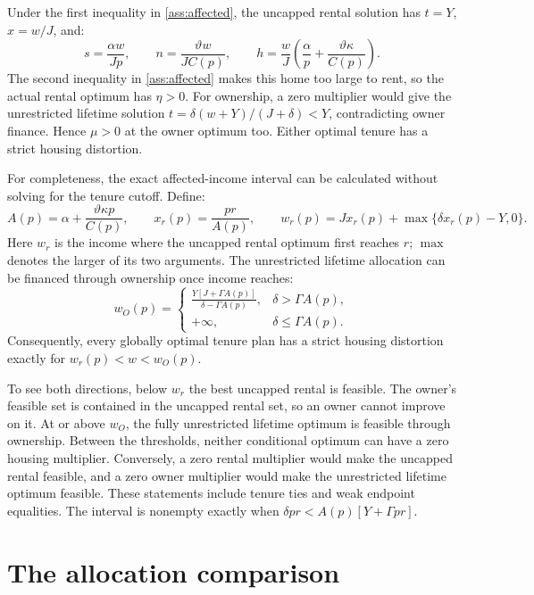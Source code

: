 \documentclass[11pt]{article}
\begin{document}
Under the first inequality in \eqref{ass:affected}, the uncapped rental
solution has $t=Y$, $x=w/J$, and:
\begin{equation}
s=\frac{\alpha w}{Jp},\qquad
n=\frac{\vartheta w}{JC(p)},\qquad
h=\frac{w}{J}\left(\frac{\alpha}{p}
                    +\frac{\vartheta\kappa}{C(p)}\right).
\end{equation}
The second inequality in \eqref{ass:affected} makes this home too large to
rent, so the actual rental optimum has $\eta>0$. For ownership, a zero
multiplier would give the unrestricted lifetime solution
$t=\delta(w+Y)/(J+\delta)<Y$, contradicting owner finance. Hence
$\mu>0$ at the owner optimum too. Either optimal tenure has a strict
housing distortion.

For completeness, the exact affected-income interval can be calculated
without solving for the tenure cutoff. Define:
\begin{equation}
A(p)=\alpha+\frac{\vartheta\kappa p}{C(p)},\qquad
x_r(p)=\frac{pr}{A(p)},\qquad
w_r(p)=Jx_r(p)+\max\{\delta x_r(p)-Y,0\}.
\end{equation}
Here $w_r$ is the income where the uncapped rental optimum first reaches
$r$; $\max$ denotes the larger of its two arguments. The unrestricted
lifetime allocation can be financed through ownership once income reaches:
\begin{equation}
w_O(p)=\begin{cases}
\displaystyle\frac{Y[J+\Gamma A(p)]}{\delta-\Gamma A(p)},
 &\delta>\Gamma A(p),\\[5pt]
+\infty,&\delta\le\Gamma A(p).
\end{cases}
\end{equation}
Consequently, every globally optimal tenure plan has a strict housing
distortion exactly for $w_r(p)<w<w_O(p)$.

To see both directions, below $w_r$ the best uncapped rental is feasible.
The owner's feasible set is contained in the uncapped rental set, so an
owner cannot improve on it. At or above $w_O$, the fully unrestricted
lifetime optimum is feasible through ownership. Between the thresholds,
neither conditional optimum can have a zero housing multiplier. Conversely,
a zero rental multiplier would make the uncapped rental feasible, and a
zero owner multiplier would make the unrestricted lifetime optimum feasible.
These statements include tenure ties and weak endpoint equalities. The
interval is nonempty exactly when $\delta pr<A(p)[Y+\Gamma pr]$.

\section{The allocation comparison}\label{app:allocation}
\end{document}
